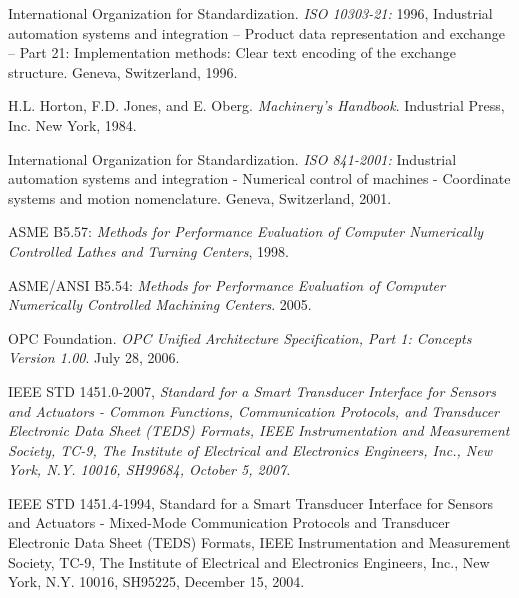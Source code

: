 \documentclass{mtconnect}	%
\begin{document}
International Organization for Standardization. \textit{ISO 10303-21:} 1996, Industrial automation systems and integration -- Product data representation and exchange -- Part 21: Implementation methods: Clear text encoding of the exchange structure. Geneva, Switzerland, 1996.

H.L. Horton, F.D. Jones, and E. Oberg. \textit{Machinery's Handbook}. Industrial Press, Inc. New York, 1984.

International Organization for Standardization. \textit{ISO 841-2001:} Industrial automation systems and integration - Numerical control of machines - Coordinate systems and motion nomenclature. Geneva, Switzerland, 2001.

ASME B5.57: \textit{Methods for Performance Evaluation of Computer Numerically Controlled Lathes and Turning Centers}, 1998.

ASME/ANSI B5.54: \textit{Methods for Performance Evaluation of Computer Numerically Controlled Machining Centers}. 2005.

OPC Foundation. \textit{OPC Unified Architecture Specification, Part 1: Concepts Version 1.00}. July 28, 2006.

IEEE STD 1451.0-2007, \textit{Standard for a Smart Transducer Interface for Sensors and Actuators - Common Functions, Communication Protocols, and Transducer Electronic Data Sheet (TEDS) Formats, IEEE Instrumentation and Measurement Society, TC-9, The Institute of Electrical and Electronics Engineers, Inc., New York, N.Y. 10016, SH99684, October 5, 2007.}

IEEE STD 1451.4-1994, Standard for a Smart Transducer Interface for Sensors and Actuators - Mixed-Mode Communication Protocols and Transducer Electronic Data Sheet (TEDS) Formats, IEEE Instrumentation and Measurement Society, TC-9, The Institute of Electrical and Electronics Engineers, Inc., New York, N.Y. 10016, SH95225, December 15, 2004. 
\end{document}
